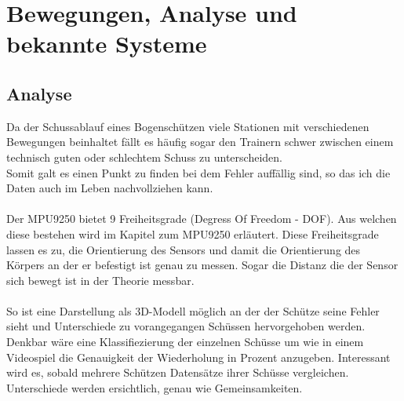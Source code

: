 \chapter{Bewegungen, Analyse und bekannte Systeme}
\section{Analyse}
Da der Schussablauf eines Bogenschützen viele Stationen mit verschiedenen Bewegungen 
beinhaltet fällt es häufig sogar den Trainern schwer zwischen einem technisch guten
oder schlechtem Schuss zu unterscheiden.\\ 
Somit galt es einen Punkt zu finden bei dem Fehler auffällig sind, so das ich die Daten auch im 
Leben nachvollziehen kann.\\
\\
Der MPU9250 bietet 9 Freiheitsgrade (Degress Of Freedom - DOF). Aus welchen diese bestehen wird
im Kapitel zum MPU9250 erläutert. Diese Freiheitsgrade lassen es zu, die Orientierung des Sensors 
und damit die Orientierung des Körpers an der er befestigt ist genau zu messen. Sogar die Distanz 
die der Sensor sich bewegt ist in der Theorie messbar.\\
\\
So ist eine Darstellung als 3D-Modell möglich an der der Schütze seine Fehler sieht und Unterschiede
zu vorangegangen Schüssen hervorgehoben werden. \\
Denkbar wäre eine Klassifiezierung der einzelnen Schüsse um wie in einem Videospiel die Genauigkeit
der Wiederholung in Prozent anzugeben. Interessant wird es, sobald mehrere Schützen Datensätze
ihrer Schüsse vergleichen. Unterschiede werden ersichtlich, genau wie Gemeinsamkeiten.\\

